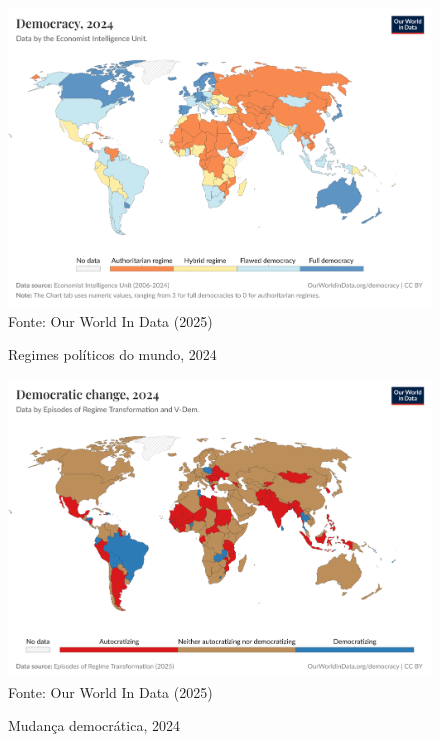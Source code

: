 \begin{figure}[ht]
    \centering
    \caption{Regimes políticos do mundo, 2024}
    \includegraphics[width=1\linewidth]{figuras/democracia/political-regime-eiu.png}
    \label{fig:political-regime-eiu}
    \footnotesize{Fonte: Our World In Data (2025)}
\end{figure}

\begin{figure}[htbp]
    \centering
    \caption{Mudança democrática, 2024}
    \includegraphics[width=1\linewidth]{figuras/democracia/political-regime-ert.png}
    \label{fig:political-regime-ert}
    \footnotesize{Fonte: Our World In Data (2025)}
\end{figure}

